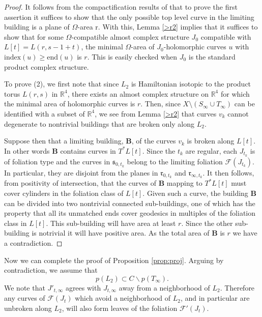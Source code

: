 \documentclass[12pt]{amsart}
\theoremstyle{definition}
\newcommand{\RR}{{\mathbb R}}
\begin{document}
\begin{proof}


It follows from the compactification results of \cite{behwz} that to prove the first assertion  it suffices to show that the only possible top level curve in the limiting building is a plane of $\Omega$-area r.  With this, Lemma \ref{>r2} implies that it suffices to show that for some $\Omega$-compatible almost complex structure $J_0$ compatible with $L[t] =L(r, s-1+t)$, the minimal $\Omega$-area of $J_0$-holomorphic curves $u$ with $\mathrm{index}(u) \ge \mathrm{end}(u)$ is $r$. This is easily checked when $J_0$ is the standard product complex structure.

\medskip

To prove (2), we first note that since $L_2$ is Hamiltonian isotopic to the product torus $L(r,s)$ in $\RR^4$, there exists an almost complex structure on $\RR^4$ for which the minimal area of holomorphic curves is $r$. Then, since $X \setminus (S_{\infty} \cup T_{\infty})$ can be identified with a subset of $\RR^4$, we see from Lemma \ref{>r2} that curves $v_k$ cannot degenerate to nontrivial buildings that are broken only along $L_2$.

Suppose then that a limiting building, $\mathbf{B}$, of the curves $v_k$ is broken along $L[t]$. In other words $\mathbf{B}$ contains curves in $T^* L[t]$. Since the $t_k$ are regular, each $J_{t_k}$ is of foliation type and the curves in $\mathfrak{s}_{0,t_k}$ belong to the limiting foliation $\mathcal{F}(J_{t_k})$. In particular, they are disjoint from the planes in $\mathfrak{r}_{0,t_k}$ and $\mathfrak{r}_{\infty,t_k}$. It then follows, from positivity of intersection, that the curves of $\mathbf{B}$ mapping to $T^* L[t]$ must cover cylinders in the foliation class of $L[t]$. Given such a curve, the building $\mathbf{B}$ can be divided into two nontrivial connected sub-buildings, one of which has the property that all its unmatched ends cover geodesics in multiples of the foliation class in $L[t]$. This sub-building will have area at least $r$. Since the other sub-building is notrivial it will have positive area. As the total area of $\mathbf{B}$ is $r$ we have a contradiction.
\end{proof}

Now we can complete the proof of Proposition \ref{prop:proj}. Arguing by contradiction, we assume that 
\begin{equation}\label{assumpa}
p(L_2) \subset C \smallsetminus p(T_\infty).    
\end{equation}
We note that $J'_{t,\infty}$ agrees with $J_{t,\infty}$ away from a neighborhood of $L_2$. Therefore any curves of $\mathcal{F}(J_t)$ which avoid a neighborhood of $L_2$, and in particular are unbroken along $L_2$, will also form leaves of the foliation $\mathcal{F}'(J_t)$.
\end{document}
